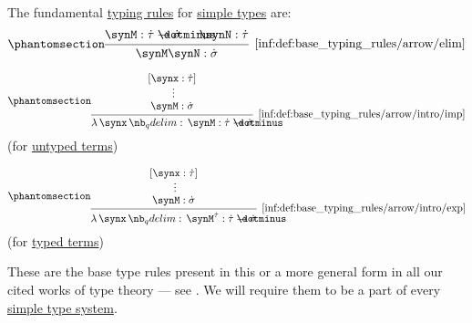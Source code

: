 \begin{definition}\label{def:base_typing_rules}
  The fundamental \hyperref[def:type_derivation_tree]{typing rules} for \hyperref[def:simple_type]{simple types} are:
  \begin{equation*}\taglabel[\ensuremath{ \rightarrow^- }]{inf:def:base_typing_rules/arrow/elim}
    \begin{prooftree}
      \hypo{ \synM: \syn\tau \synimplies \syn\sigma }
      \hypo{ \synN: \syn\tau }
      \infer2[\ref{inf:def:base_typing_rules/arrow/elim}]{ \synM \synN: \syn\sigma }
    \end{prooftree}
  \end{equation*}
  \begin{paracol}{2}
    \begin{leftcolumn}
      \centering
      \begin{equation*}\taglabel[\ensuremath{ \rightarrow^+ }]{inf:def:base_typing_rules/arrow/intro/imp}
        \begin{prooftree}
          \hypo{ [\synx: \syn\tau] }
          \ellipsis {} { \synM: \syn\sigma }
          \infer1[\ref{inf:def:base_typing_rules/arrow/intro/imp}]{ \qabs \synx \synM: \syn\tau \synimplies \syn\sigma }
        \end{prooftree}
      \end{equation*}
      (for \hyperref[def:lambda_term]{untyped terms})\phantom{\( \rightarrow^+ \)}
    \end{leftcolumn}

    \begin{rightcolumn}
      \centering
      \begin{equation*}\taglabel[\ensuremath{ \rightarrow_{\T{tt}}^+ }]{inf:def:base_typing_rules/arrow/intro/exp}
        \begin{prooftree}
          \hypo{ [\synx: \syn\tau] }
          \ellipsis {} { \synM: \syn\sigma }
          \infer1[\ref{inf:def:base_typing_rules/arrow/intro/exp}]{ \qabs \synx \synM^{\syn\tau}: \syn\tau \synimplies \syn\sigma }
        \end{prooftree}
      \end{equation*}
      (for \hyperref[def:typed_lambda_term]{typed terms})\phantom{\( \rightarrow_\tau^+ \)}
    \end{rightcolumn}
  \end{paracol}
\end{definition}
\begin{comments}
  \item These are the base type rules present in this or a more general form in all our cited works of type theory --- see . We will require them to be a part of every \hyperref[def:simple_type_system]{simple type system}.
\end{comments}

